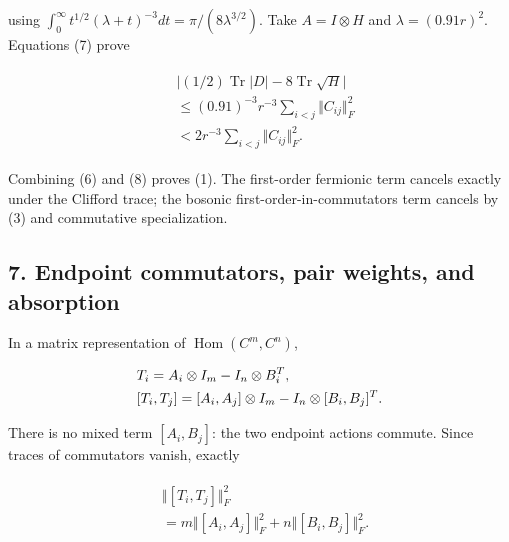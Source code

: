 using
\(\int _{0}^{\infty} t^{1/2}( \lambda  +t)^{-3}dt= \pi  /(8 \lambda ^{3/2})\).
Take \(A=I \otimes  H\) and \(\lambda  =(0.91r)^{2}\). Equations (7)
prove

\begin{gather*}
\begin{aligned}
& \vert (1/2)\operatorname{Tr}  \vert D\vert -8\operatorname{Tr}  \sqrt{H}\vert \\
& \le (0.91)^{-3} r^{-3}\sum _{i<j}\Vert C_{ij}\Vert _{F}^{2} \\
& <2 r^{-3}\sum _{i<j}\Vert C_{ij}\Vert _{F}^{2}.
\end{aligned}\tag{8}
\end{gather*}

Combining (6) and (8) proves (1). The first-order fermionic term cancels
exactly under the Clifford trace; the bosonic first-order-in-commutators
term cancels by (3) and commutative specialization.

\subsection{7. Endpoint commutators, pair weights, and
absorption}\label{b-endpoint-commutators-pair-weights-and-absorption}

In a matrix representation of \(\operatorname{Hom} (C^{m},C^{n})\),

\begin{gather*}
\begin{aligned}
& T_{i}=A_{i} \otimes  I_{m}-I_{n} \otimes  B_{i}^{T}, \\
& [T_{i},T_{j}]=[A_{i},A_{j}] \otimes  I_{m}-I_{n} \otimes  [B_{i},B_{j}]^{T}.
\end{aligned}\notag
\end{gather*}

There is no mixed term \([A_{i},B_{j}]\): the two endpoint actions
commute. Since traces of commutators vanish, exactly

\begin{gather*}
\begin{aligned}
& \Vert [T_{i},T_{j}]\Vert _{F}^{2} \\
& =m\Vert [A_{i},A_{j}]\Vert _{F}^{2}+n\Vert [B_{i},B_{j}]\Vert _{F}^{2}.
\end{aligned}\tag{9}
\end{gather*}

